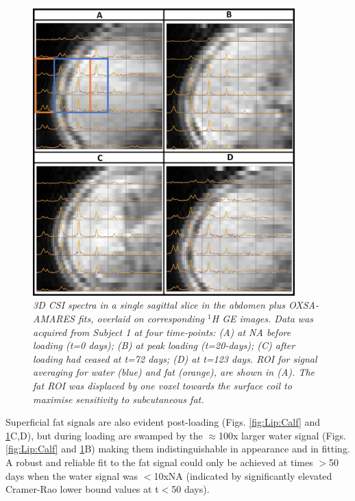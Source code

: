\begin{figure}
    \centering
    \includegraphics[width=0.9\textwidth]{Figures/Lipid/Abdomen.png}
    \caption{\textit{3D \ac{CSI} spectra in a single sagittal slice in the abdomen plus OXSA-AMARES fits, overlaid on corresponding $^1$H \ac{GE} images. Data was acquired from Subject 1 at four time-points: (A) at NA before loading (t=0 days); (B) at peak loading (t=20-days); (C) after loading had ceased at t=72 days; (D) at t=123 days. \ac{ROI} for signal averaging for water (blue) and fat (orange), are shown in (A). The fat \ac{ROI} was displaced by one voxel towards the surface coil to maximise sensitivity to subcutaneous fat.}}
    \label{fig:Lip:Abdomen}
\end{figure}

Superficial fat signals are also evident post-loading (Figs. \ref{fig:Lip:Calf} and \ref{fig:Lip:Abdomen}C,D), but during loading are swamped by the $\approx$100x larger water signal (Figs. \ref{fig:Lip:Calf} and \ref{fig:Lip:Abdomen}B) making them indistinguishable in appearance and in fitting. A robust and reliable fit to the fat signal could only be achieved at times $>$50 days when the water signal was $<$10x\ac{NA} (indicated by significantly elevated Cramer-Rao lower bound values at t$<$50 days).

